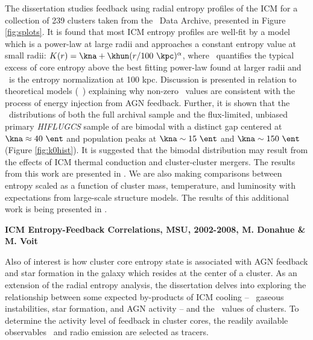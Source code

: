 \documentclass[12pt]{cv}
\begin{document}
The dissertation studies feedback using radial entropy profiles of the
ICM for a collection of 239 clusters taken from the \chandra\ Data
Archive, presented in Figure \ref{fig:splots}. It is found that most
ICM entropy profiles are well-fit by a model which is a power-law at
large radii and approaches a constant entropy value at small radii:
$K(r) = \kna + \khun (r/100 ~\kpc)^{\alpha}$, where \kna\ quantifies
the typical excess of core entropy above the best fitting power-law
found at larger radii and \khun\ is the entropy normalization at 100
kpc. Discussion is presented in relation to theoretical models
(\eg\ \cite{agnframework}) explaining why non-zero \kna\ values are
consistent with the process of energy injection from AGN
feedback. Further, it is shown that the \kna\ distributions of both
the full archival sample and the flux-limited, unbiased primary
{\it{HIFLUGCS}} sample of \cite{hiflugcs1,hiflugcs2} are bimodal with
a distinct gap centered at $\kna \approx 40 ~\ent$ and population
peaks at $\kna \sim 15 ~\ent$ and $\kna \sim 150 ~\ent$ (Figure
\ref{fig:k0hist}). It is suggested that the bimodal distribution may
result from the effects of ICM thermal conduction and cluster-cluster
mergers. The results from this work are presented in \cite{accept}. We
are also making comparisons between entropy scaled as a function of
cluster mass, temperature, and luminosity with expectations from
large-scale structure models. The results of this additional work is
being presented in \cite{entscale}.

{\bfseries{ICM Entropy-Feedback Correlations, MSU, 2002-2008, M. Donahue \& M. Voit}}

Also of interest is how cluster core entropy state is associated with
AGN feedback and star formation in the galaxy which resides at the
center of a cluster. As an extension of the radial entropy analysis,
the dissertation delves into exploring the relationship between some
expected by-products of ICM cooling -- \eg\ gaseous instabilities,
star formation, and AGN activity -- and the \kna\ values of
clusters. To determine the activity level of feedback in cluster
cores, the readily available observables \halpha\ and radio emission
are selected as tracers.
\end{document}
